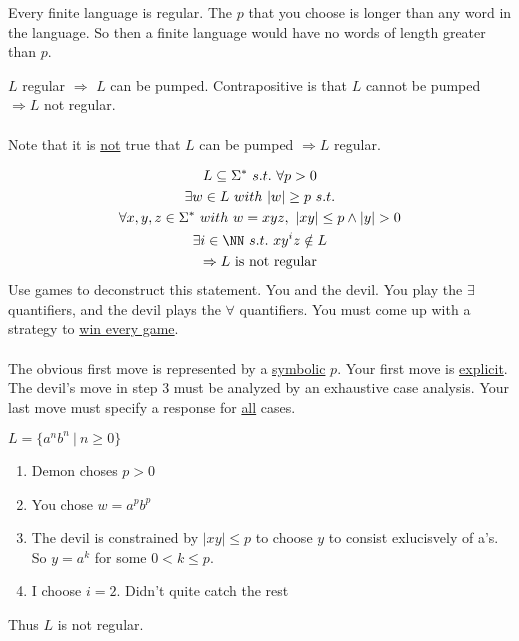 \documentclass[../598comp.tex]{subfiles}
\begin{document}
\begin{fact}
  Every finite language is regular. The $p$ that you choose is longer than any
  word in the language. So then a finite language would have no words of length
  greater than $p$.
\end{fact}

\begin{fact}
  $L$ regular $\Rightarrow$ $L$ can be pumped. Contrapositive is that $L$ cannot
  be pumped $\Rightarrow L$ not regular.
  \\\\
  Note that it is \ul{not} true that $L$ can be pumped $\Rightarrow L$ regular.
\end{fact}

\begin{lemma}
  \begin{gather*}
    L \subseteq \Sigma^* \ s.t. \ \forall p > 0 \\
    \exists w \in L \ with \ |w| \geq p \ s.t. \\
    \forall x, y, z \in \Sigma^* \ with \ w = xyz, \ |xy| \leq p \wedge |y| > 0
    \\
    \exists i \in \NN \ s.t. \ xy^iz \notin L \\
    \Rightarrow L \ \text{is not regular}
  \end{gather*}
  Use games to deconstruct this statement. You and the devil. You play the
  $\exists$ quantifiers, and the devil plays the $\forall$ quantifiers. You must
  come up with a strategy to \ul{win every game}.
  \\\\
  The obvious first move is represented by a \ul{symbolic} $p$. Your first move
  is \ul{explicit}. The devil's move in step 3 must be analyzed by an exhaustive
  case analysis. Your last move must specify a response for \ul{all} cases.
\end{lemma}

\begin{example}
  $L = \{a^nb^n \ | \ n \geq 0\}$
  \begin{enumerate}
  \item 
    Demon choses $p > 0$
  \item 
    You chose $w = a^pb^p$
  \item 
    The devil is constrained by $|xy| \leq p$ to choose $y$ to consist
    exlucisvely of a's. So $y = a^k$ for some $0 < k \leq p$.
  \item 
    I choose $i = 2$. Didn't quite catch the rest
  \end{enumerate}
  Thus $L$ is not regular.
\end{example}
\end{document}

